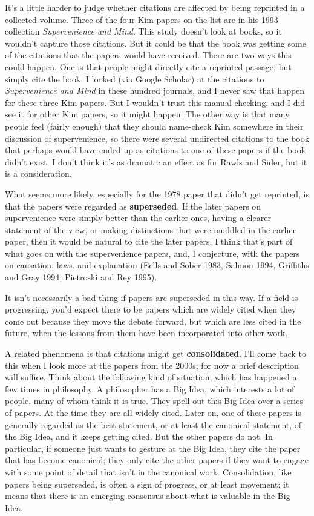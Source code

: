 \documentclass[
  10pt,
  letterpaper,
  DIV=11,
  numbers=noendperiod,
  twoside]{scrartcl}
\begin{document}
It's a little harder to judge whether citations are affected by being
reprinted in a collected volume. Three of the four Kim papers on the
list are in his 1993 collection \emph{Supervenience and Mind}. This
study doesn't look at books, so it wouldn't capture those citations. But
it could be that the book was getting some of the citations that the
papers would have received. There are two ways this could happen. One is
that people might directly cite a reprinted passage, but simply cite the
book. I looked (via Google Scholar) at the citations to
\emph{Supervenience and Mind} in these hundred journals, and I never saw
that happen for these three Kim papers. But I wouldn't trust this manual
checking, and I did see it for other Kim papers, so it might happen. The
other way is that many people feel (fairly enough) that they should
name-check Kim somewhere in their discussion of supervenience, so there
were several undirected citations to the book that perhaps would have
ended up as citations to one of these papers if the book didn't exist. I
don't think it's as dramatic an effect as for Rawls and Sider, but it is
a consideration.

What seems more likely, especially for the 1978 paper that didn't get
reprinted, is that the papers were regarded as \textbf{superseded}. If
the later papers on supervenience were simply better than the earlier
ones, having a clearer statement of the view, or making distinctions
that were muddled in the earlier paper, then it would be natural to cite
the later papers. I think that's part of what goes on with the
supervenience papers, and, I conjecture, with the papers on causation,
laws, and explanation (Eells and Sober 1983, Salmon 1994, Griffiths and
Gray 1994, Pietroski and Rey 1995).

It isn't necessarily a bad thing if papers are superseded in this way.
If a field is progressing, you'd expect there to be papers which are
widely cited when they come out because they move the debate forward,
but which are less cited in the future, when the lessons from them have
been incorporated into other work.

A related phenomena is that citations might get \textbf{consolidated}.
I'll come back to this when I look more at the papers from the 2000s;
for now a brief description will suffice. Think about the following kind
of situation, which has happened a few times in philosophy. A
philosopher has a Big Idea, which interests a lot of people, many of
whom think it is true. They spell out this Big Idea over a series of
papers. At the time they are all widely cited. Later on, one of these
papers is generally regarded as the best statement, or at least the
canonical statement, of the Big Idea, and it keeps getting cited. But
the other papers do not. In particular, if someone just wants to gesture
at the Big Idea, they cite the paper that has become canonical; they
only cite the other papers if they want to engage with some point of
detail that isn't in the canonical work. Consolidation, like papers
being superseded, is often a sign of progress, or at least movement; it
means that there is an emerging consensus about what is valuable in the
Big Idea.
\end{document}
